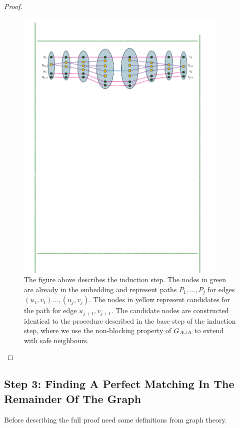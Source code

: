 \documentclass[11pt]{article}
\begin{document}
\begin{proof}
\begin{figure}
	\includegraphics[width=0.9\textwidth
	]{assets/InductionStep.pdf}
	\caption{The figure above describes the induction step. The nodes in green are already in the embedding and represent paths $P_1, \dots, P_j$ for edges $(u_1, v_1) \dots, (u_j, v_j)$.
	The nodes in yellow represent candidates for the path for edge $u_{j+1}, v_{j+1}$. 
	The candidate nodes are constructed identical to the procedure described in the base step of the induction step, where we use the non-blocking property of $G_{A \cup A}$ to extend with safe neighbours. 
	}
	\label{fig:induction}
\end{figure}

	
\end{proof}

\subsection{Step 3: Finding A Perfect Matching In The Remainder Of The Graph}

Before describing the full proof need some definitions from graph theory.
\end{document}

